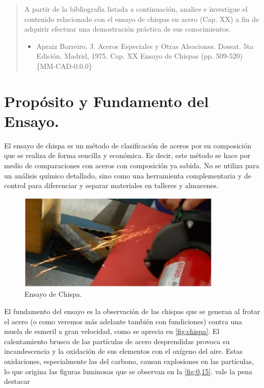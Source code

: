 \documentclass[12pt,a4paper]{article}
\begin{document}

\newpage
\tableofcontents

\begin{abstract}
    A partir de la bibliografía listada a continuación, analice e investigue el contenido relacionado con el ensayo de chispas en acero (Cap. XX) a fin de adquirir efectuar una demostración práctica de sus conocimientos.
    \begin{itemize}
        \item Apraiz Barreiro, J. Aceros Especiales y Otras Aleaciones. Dossat. 5ta Edición. Madrid, 1975. Cap. XX Ensayo de Chispas (pp. 509-520) \{MM-CAD-0.0.0\}
    \end{itemize}
\end{abstract}

\section{Propósito y Fundamento del Ensayo.}

El ensayo de chispa es un método de clasificación de aceros por su composición que se realiza de forma sencilla y económica. Es decir, este método se hace por medio de comparaciones con aceros con composición ya sabida. No se utiliza para un análisis químico detallado, sino como una herramienta complementaria y de control para diferenciar y separar materiales en talleres y almacenes.

\begin{figure}[h]
    \centering
    \includegraphics[width=0.7\linewidth]{Figuras/Chispa.png}
    \caption{Ensayo de Chispa.}
    \label{fig:chispa}
\end{figure}

El fundamento del ensayo es la observación de las chispas que se generan al frotar el acero (o como veremos más adelante también con fundiciones) contra una muela de esmeril a gran velocidad, como se aprecia en \autoref{fig:chispa}. El calentamiento brusco de las partículas de acero desprendidas provoca su incandescencia y la oxidación de sus elementos con el oxígeno del aire. Estas oxidaciones, especialmente las del carbono, causan explosiones en las partículas, lo que origina las figuras luminosas que se observan en la \autoref{fig:0,15}. vale la pena destacar 
\end{document}
